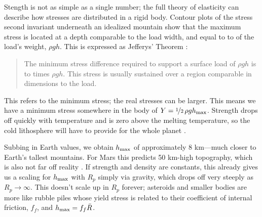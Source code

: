 
%
%

Stength is not as simple as a single number; the full theory of elasticity can describe how stresses are distributed in a rigid body. Contour plots of the stress second invariant underneath an idealized mountain show that the maximum stress is located at a depth comparable to the load width, and equal to  to  of the load's weight, $\rho gh$. This is expressed as Jefferys' Theorem \citep{Melosh2011}: 
\begin{quote}
The minimum stress difference required to support a surface load of $\rho g h$ is  to  times $\rho gh$. This stress is usually sustained over a region comparable in dimensions to the load.
\end{quote}
This refers to the minimum stress; the real stresses can be larger. This means we have a minimum stress somewhere in the body of $Y = \nicefrac{1}{2}\, \rho g h_{\rm max}$. Strength drops off quickly with temperature and is zero above the melting temperature, so the cold lithosphere will have to provide for the whole planet \citep{Melosh2011}.

Subbing in Earth values, %
we obtain $h_{\rm max}$ of approximately 8 km---much closer to Earth's tallest mountains. For Mars this predicts 50 km-high topography, which is also not far off reality \citep{Melosh2011}. If strength and density are constants, this already gives us a scaling for $h_{\rm max}$ with $R_p$ simply via gravity, which drops off very steeply as $R_p \to \infty$. This doesn't scale up in $R_p$ forever; asteroids and smaller bodies are more like rubble piles whose yield stress is related to their coefficient of internal friction, $f_f$, and $h_{\rm max} = f_f \bar{R}$.

